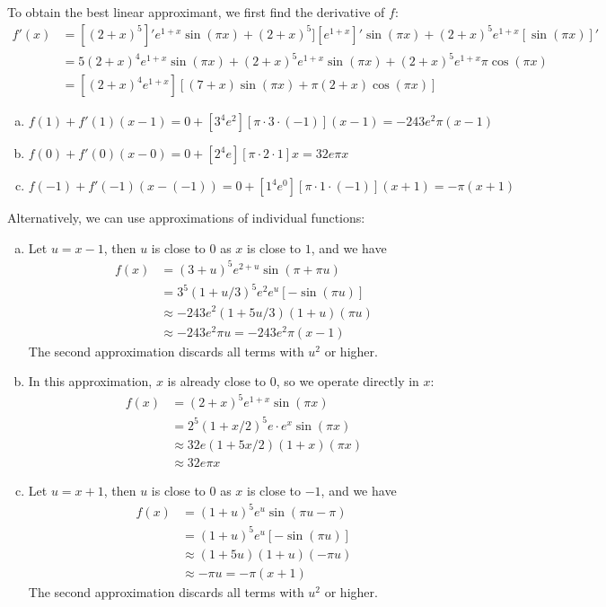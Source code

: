 \documentclass[11pt,letterpaper]{article}
\begin{document}
\noindent To obtain the best linear approximant, we first find the derivative of $f$:
\begin{align*}
    f'(x) &= [(2+x)^5]'e^{1+x}\sin(\pi x)+(2+x)^5][e^{1+x}]'\sin(\pi x)+(2+x)^5e^{1+x}[\sin(\pi x)]'\\
    &= 5(2+x)^4e^{1+x}\sin(\pi x) + (2+x)^5e^{1+x}\sin(\pi x) + (2+x)^5e^{1+x}\pi\cos(\pi x)\\
    &=[(2+x)^4e^{1+x}][(7+x)\sin(\pi x)+\pi(2+x)\cos(\pi x)]
\end{align*}
\begin{enumerate}[(a)]
    \item $f(1)+f'(1)(x-1) = 0 + [3^4e^2][\pi \cdot 3 \cdot (-1)](x-1) = -243e^2\pi(x-1)$
    \item $f(0)+f'(0)(x-0) = 0 + [2^4e][\pi \cdot 2 \cdot 1]x = 32e\pi x$
    \item $f(-1)+f'(-1)(x-(-1)) = 0 + [1^4e^0][\pi \cdot 1 \cdot (-1)](x+1) = -\pi(x+1)$
\end{enumerate}
\noindent Alternatively, we can use approximations of individual functions:
\begin{enumerate}[(a)]
    \item Let $u = x-1$, then $u$ is close to $0$ as $x$ is close to $1$, and we have
    \begin{align*}
        f(x) &= (3+u)^5e^{2+u}\sin(\pi+\pi u) \\
        &= 3^5(1+u/3)^5e^2e^u[-\sin(\pi u)] \\
        &\approx -243e^2(1+5u/3)(1+u)(\pi u) \\
        &\approx -243e^2 \pi u = -243e^2\pi(x-1)
    \end{align*}
    The second approximation discards all terms with $u^2$ or higher.
    \item In this approximation, $x$ is already close to $0$, so we operate directly in $x$:
    \begin{align*}
        f(x) &= (2+x)^5e^{1+x}\sin(\pi x) \\
        &= 2^5(1+x/2)^5 e \cdot e^x \sin(\pi x) \\
        &\approx 32e(1+5x/2)(1+x)(\pi x) \\
        &\approx 32e \pi x
    \end{align*}
    \item Let $u = x+1$, then $u$ is close to $0$ as $x$ is close to $-1$, and we have
    \begin{align*}
        f(x) &= (1+u)^5e^{u}\sin(\pi u-\pi) \\
        &= (1+u)^5e^u[-\sin(\pi u)]\\
        &\approx (1+5u)(1+u)(-\pi u) \\
        &\approx -\pi u = -\pi(x+1)
    \end{align*}
    The second approximation discards all terms with $u^2$ or higher.
\end{enumerate}
\end{document}
